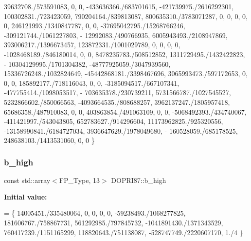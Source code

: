 \begin{DoxyCode}
    39632708./573591083,     0,      0,        -433636366./683701615,      -421739975./2616292301,  
      100302831./723423059,      790204164./839813087,      800635310./3783071287,     0,                         0,     
                        0,                      0,  0,
    246121993./1340847787,   0,      0,        -37695042795./15268766246,  -309121744./1061227803,  -
      12992083./490766935,      6005943493./2108947869,    393006217./1396673457,     123872331./1001029789,     0,     
                        0,                      0,  0,
    -1028468189./846180014,  0,      0,        8478235783./508512852,      1311729495./1432422823,  -
      10304129995./1701304382,  -48777925059./3047939560,  15336726248./1032824649,   -45442868181./3398467696,  
      3065993473./597172653,   0,                      0,  0,
    185892177./718116043,    0,      0,        -3185094517./667107341,     -477755414./1098053517,  -
      703635378./230739211,     5731566787./1027545527,    5232866602./850066563,     -4093664535./808688257,    
      3962137247./1805957418,  65686358./487910083,    0,  0,
    403863854./491063109,    0,      0,        -5068492393./434740067,     -411421997./543043805,   
      652783627./914296604,      11173962825./925320556,    -13158990841./6184727034,  3936647629./1978049680,    -
      160528059./685178525,   248638103./1413531060,  0,  0
  \}
\end{DoxyCode}
\mbox{\label{structDOPRI87_abd810799ee712d0b3f92bd04474e7fe3}} 
\subsubsection{\texorpdfstring{b\+\_\+high}{b\_high}}
{\footnotesize\ttfamily const std\+::array$<$F\+P\+\_\+\+Type, 13$>$ D\+O\+P\+R\+I87\+::b\+\_\+high}

{\bfseries Initial value\+:}
\begin{DoxyCode}
= \{
     14005451./335480064, 0, 0, 0, 0, -59238493./1068277825, 181606767./758867731,   561292985./797845732, 
        -1041891430./1371343529,  760417239./1151165299, 118820643./751138087, -528747749./2220607170,  1./4
   \}
\end{DoxyCode}
\mbox{\label{structDOPRI87_a12b1ba26c0d854fdf42760d785bf26d5}} 
